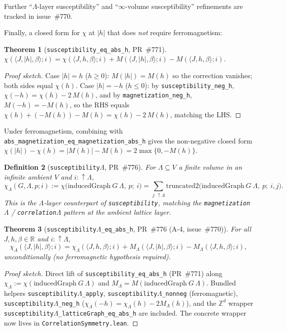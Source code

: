 \documentclass[a4paper,11pt]{article}
\newtheorem{theorem}{Theorem}
\newtheorem{definition}[theorem]{Definition}
\newcommand{\LeanLambda}{\texorpdfstring{\ensuremath{\Lambda}}{Lambda}}
\begin{document}
Further ``$\Lambda$-layer susceptibility'' and
``$\infty$-volume susceptibility'' refinements are tracked in
issue~\#770.

Finally, a closed form for $\chi$ at $|h|$ that does \emph{not} require
ferromagnetism:
\begin{theorem}[\texttt{susceptibility\_eq\_abs\_h}, PR~\#771]
$\chi(\langle J,|h|,\beta\rangle;i)
 = \chi(\langle J,h,\beta\rangle;i)
   + M(\langle J,|h|,\beta\rangle;i) - M(\langle J,h,\beta\rangle;i)$.
\end{theorem}
\begin{proof}[Proof sketch]
Case $|h| = h$ ($h\ge 0$): $M(|h|) = M(h)$ so the correction vanishes;
both sides equal $\chi(h)$. Case $|h| = -h$ ($h\le 0$): by
\texttt{susceptibility\_neg\_h}, $\chi(-h) = \chi(h) - 2\,M(h)$, and by
\texttt{magnetization\_neg\_h}, $M(-h) = -M(h)$, so the RHS equals
$\chi(h) + (-M(h)) - M(h) = \chi(h) - 2\,M(h)$, matching the LHS.
\end{proof}
\noindent Under ferromagnetism, combining with
\texttt{abs\_magnetization\_eq\_magnetization\_abs\_h} gives the
non-negative closed form
$\chi(|h|) - \chi(h) = |M(h)| - M(h) = 2\max\{0,-M(h)\}$.

\begin{definition}[\texttt{susceptibility\LeanLambda}, PR~\#776]
For $\Lambda \subseteq V$ a finite volume in an infinite ambient $V$ and
$i : \uparrow\Lambda$,
\[
  \chi_\Lambda(G, \Lambda, p; i)
  := \chi\bigl(\mathrm{inducedGraph}\ G\ \Lambda,\ p;\ i\bigr)
  = \sum_{j : \uparrow\Lambda}\mathrm{truncated2}\bigl(\mathrm{inducedGraph}\ G\ \Lambda,\ p;\ i, j\bigr).
\]
This is the $\Lambda$-layer counterpart of \texttt{susceptibility}, matching
the \texttt{magnetization\LeanLambda} / \texttt{correlation\LeanLambda} pattern at the ambient
lattice layer.
\end{definition}

\begin{theorem}[\texttt{susceptibility\LeanLambda\_eq\_abs\_h}, PR~\#776 (A-4, issue~\#770)]
For all $J, h, \beta \in \mathbb R$ and $i : \uparrow\Lambda$,
\[
  \chi_\Lambda(\langle J, |h|, \beta\rangle; i)
  = \chi_\Lambda(\langle J, h, \beta\rangle; i)
    + M_\Lambda(\langle J, |h|, \beta\rangle; i) - M_\Lambda(\langle J, h, \beta\rangle; i),
\]
unconditionally (no ferromagnetic hypothesis required).
\end{theorem}
\begin{proof}[Proof sketch]
Direct lift of \texttt{susceptibility\_eq\_abs\_h} (PR~\#771) along
$\chi_\Lambda := \chi(\mathrm{inducedGraph}\ G\ \Lambda)$ and
$M_\Lambda = M(\mathrm{inducedGraph}\ G\ \Lambda)$. Bundled helpers
\texttt{susceptibility\LeanLambda\_apply}, \texttt{susceptibility\LeanLambda\_nonneg}
(ferromagnetic), \texttt{susceptibility\LeanLambda\_neg\_h}
($\chi_\Lambda(-h) = \chi_\Lambda(h) - 2 M_\Lambda(h)$), and the
$\mathbb{Z}^d$ wrapper
\texttt{susceptibility\LeanLambda\_latticeGraph\_eq\_abs\_h} are included.
The concrete wrapper now lives in
\texttt{CorrelationSymmetry.lean}.
\end{proof}
\end{document}

